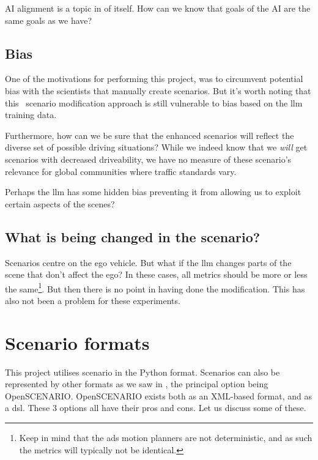AI alignment is a topic in of itself. How can we know that goals of the AI are the same goals as we
have?

\subsection{Bias}

One of the motivations for performing this project, was to circumvent potential bias with the
scientists that manually create scenarios. But it's worth noting that this \hefe~scenario
modification approach is still vulnerable to bias based on the \acrshort{llm} training data.

Furthermore, how can we be sure that the enhanced scenarios will reflect the diverse set of possible
driving situations? While we indeed know that we \emph{will} get scenarios with decreased
driveability, we have no measure of these scenario's relevance for global communities where traffic
standards vary.

Perhaps the \acrshort{llm} has some hidden bias preventing it from allowing us to exploit certain
aspects of the scenes?

\subsection{What is being changed in the scenario?}

Scenarios centre on the ego vehicle. But what if the \acrshort{llm} changes parts of the scene that
don't affect the ego? In these cases, all metrics should be more or less the same\footnote{Keep in
    mind that the \acrshort{ads} motion planners are not deterministic, and as such the metrics will typically
    not be identical.}. But then there is no point in having done the modification. This has also not
been a problem for these experiments.

\section{Scenario formats}

This project utilises scenario in the Python format. Scenarios can also be represented by other
formats as we saw in , the principal option being OpenSCENARIO.
OpenSCENARIO exists both as an XML-based format, and as a \acrfull{dsl}. These \num{3} options all
have their pros and cons. Let us discuss some of these.

